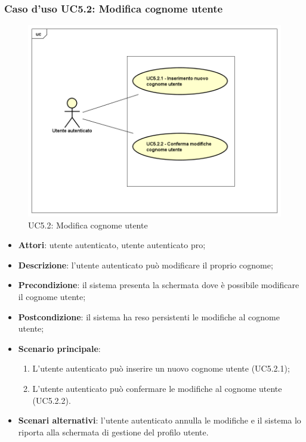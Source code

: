 \subsubsection{Caso d'uso UC5.2: Modifica cognome utente}
\label{UC5.2}
\begin{figure}[h]
	\centering
	\includegraphics[scale=0.5,keepaspectratio]{UML/UC5_2.png}
	\caption{UC5.2: Modifica cognome utente}
\end{figure}
\begin{itemize}
	\item \textbf{Attori}: utente autenticato, utente autenticato pro;
	\item \textbf{Descrizione}: l'utente autenticato può modificare il proprio cognome;
	\item \textbf{Precondizione}: il sistema presenta la schermata dove è possibile modificare il cognome utente;
	\item \textbf{Postcondizione}: il sistema ha reso persistenti le modifiche al cognome utente;
	\item \textbf{Scenario principale}:
	\begin{enumerate}
		\item L'utente autenticato può inserire un nuovo cognome utente (UC5.2.1);
		\item L'utente autenticato può confermare le modifiche al cognome utente (UC5.2.2).
	\end{enumerate}
	\item \textbf{Scenari alternativi}: l'utente autenticato annulla le modifiche e il sistema lo riporta alla schermata di gestione del profilo utente.
\end{itemize}


